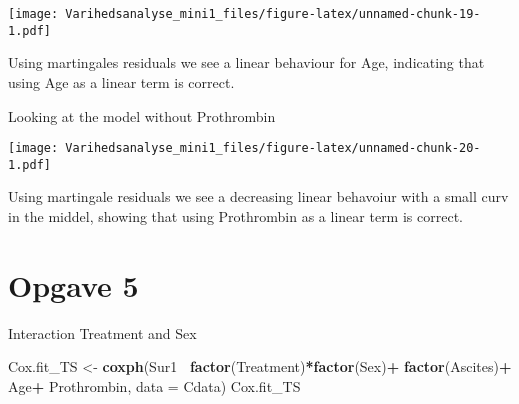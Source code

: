 \documentclass[
]{article}
\newenvironment{Shaded}{\begin{snugshade}}{\end{snugshade}}
\newcommand{\CommentTok}[1]{\textcolor[rgb]{0.56,0.35,0.01}{\textit{#1}}}
\newcommand{\DataTypeTok}[1]{\textcolor[rgb]{0.13,0.29,0.53}{#1}}
\newcommand{\KeywordTok}[1]{\textcolor[rgb]{0.13,0.29,0.53}{\textbf{#1}}}
\newcommand{\NormalTok}[1]{#1}
\newcommand{\OperatorTok}[1]{\textcolor[rgb]{0.81,0.36,0.00}{\textbf{#1}}}
\newcommand{\StringTok}[1]{\textcolor[rgb]{0.31,0.60,0.02}{#1}}
\begin{document}
\texttt{[image: Varihedsanalyse\_mini1\_files/figure-latex/unnamed-chunk-19-1.pdf]}

Using martingales residuals we see a linear behaviour for Age,
indicating that using Age as a linear term is correct.

Looking at the model without Prothrombin

\begin{Shaded}
\end{Shaded}

\texttt{[image: Varihedsanalyse\_mini1\_files/figure-latex/unnamed-chunk-20-1.pdf]}

Using martingale residuals we see a decreasing linear behavoiur with a
small curv in the middel, showing that using Prothrombin as a linear
term is correct.

\hypertarget{opgave-5}{%
\section{Opgave 5}\label{opgave-5}}

\begin{Shaded}
\end{Shaded}

Interaction Treatment and Sex

\begin{Shaded}
\begin{Highlighting}[]
\NormalTok{Cox.fit_TS <-}\StringTok{ }\KeywordTok{coxph}\NormalTok{(Sur1}\OperatorTok{~}\StringTok{ }\KeywordTok{factor}\NormalTok{(Treatment)}\OperatorTok{*}\KeywordTok{factor}\NormalTok{(Sex)}\OperatorTok{+}\StringTok{ }\KeywordTok{factor}\NormalTok{(Ascites)}\OperatorTok{+}\StringTok{ }\NormalTok{Age}\OperatorTok{+}\StringTok{ }\NormalTok{Prothrombin, }\DataTypeTok{data =}\NormalTok{ Cdata)}
\NormalTok{Cox.fit_TS}
\end{Highlighting}
\end{Shaded}
\end{document}
